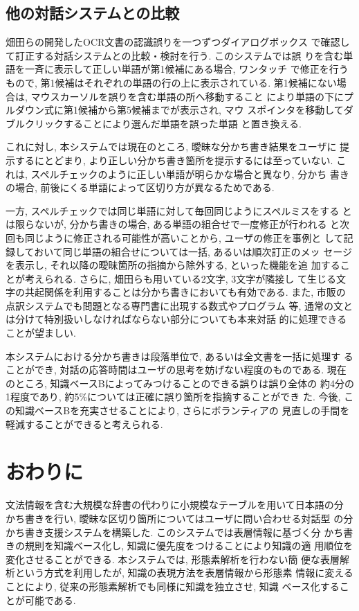 \subsection{他の対話システムとの比較}
畑田らの開発したOCR文書の認識誤りを一つずつダイアログボックス
で確認して訂正する対話システムとの比較・検討を行う. このシステムでは誤
りを含む単語を一斉に表示して正しい単語が第1候補にある場合, ワンタッチ
で修正を行うもので, 第1候補はそれぞれの単語の行の上に表示されている. 
第1候補にない場合は, マウスカーソルを誤りを含む単語の所へ移動すること
により単語の下にプルダウン式に第1候補から第5候補までが表示され, マウ
スポインタを移動してダブルクリックすることにより選んだ単語を誤った単語
と置き換える. 

これに対し, 本システムでは現在のところ, 曖昧な分かち書き結果をユーザに
提示するにとどまり, より正しい分かち書き箇所を提示するには至っていない. 
これは, スペルチェックのように正しい単語が明らかな場合と異なり, 分かち
書きの場合, 前後にくる単語によって区切り方が異なるためである. 

一方, スペルチェックでは同じ単語に対して毎回同じようにスペルミスをする
とは限らないが, 分かち書きの場合, ある単語の組合せで一度修正が行われる
と次回も同じように修正される可能性が高いことから, ユーザの修正を事例と
して記録しておいて同じ単語の組合せについては一括, あるいは順次訂正のメッ
セージを表示し, それ以降の曖昧箇所の指摘から除外する, といった機能を追
加することが考えられる. さらに, 畑田らも用いている2文字, 3文字が隣接し
て生じる文字の共起関係を利用することは分かち書きにおいても有効である. 
また, 市販の点訳システムでも問題となる専門書に出現する数式やプログラム
等, 通常の文とは分けて特別扱いしなければならない部分についても本来対話
的に処理できることが望ましい. 

本システムにおける分かち書きは段落単位で, あるいは全文書を一括に処理す
ることができ, 対話の応答時間はユーザの思考を妨げない程度のものである. 
現在のところ, 知識ベースBによってみつけることのできる誤りは誤り全体の
約4分の1程度であり, 約5\%については正確に誤り箇所を指摘することができ
た. 今後, この知識ベースBを充実させることにより, さらにボランティアの
見直しの手間を軽減することができると考えられる. 

\section{おわりに}
文法情報を含む大規模な辞書の代わりに小規模なテーブルを用いて日本語の分
かち書きを行い, 曖昧な区切り箇所についてはユーザに問い合わせる対話型
の分かち書き支援システムを構築した. このシステムでは表層情報に基づく分
かち書きの規則を知識ベース化し, 知識に優先度をつけることにより知識の適
用順位を変化させることができる. 本システムでは, 形態素解析を行わない簡
便な表層解析という方式を利用したが, 知識の表現方法を表層情報から形態素
情報に変えることにより, 従来の形態素解析でも同様に知識を独立させ, 知識
ベース化することが可能である. 

